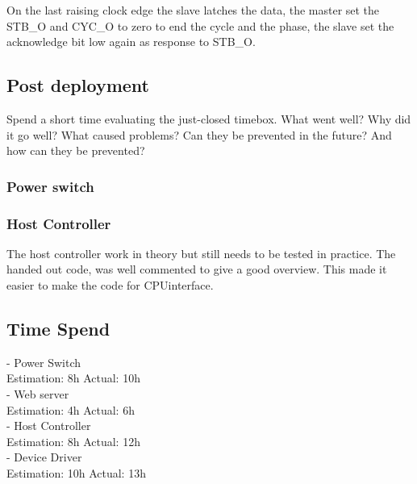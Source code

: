 On the last raising clock edge the slave latches the data, the master set the STB\_O and CYC\_O to zero to end the cycle and the phase, the slave set the acknowledge bit low again as response to STB\_O.

\subsection{Post deployment}
Spend a short time evaluating the just-closed timebox. What went well? Why did it go well? What caused problems? Can they be prevented in the future? And how can they be prevented?
\subsubsection{Power switch}
\subsubsection{Host Controller}
The host controller work in theory but still needs to be tested in practice. The handed out code, was well commented to give a good overview. This made it easier to make the code for CPUinterface.

\subsection{Time Spend}
- Power Switch 
\\Estimation: 8h 	Actual: 10h\\
- Web server 
\\Estimation: 4h 	Actual: 6h\\
- Host Controller
\\Estimation: 8h 	Actual: 12h\\
- Device Driver 
\\Estimation: 10h 	Actual: 13h\\


